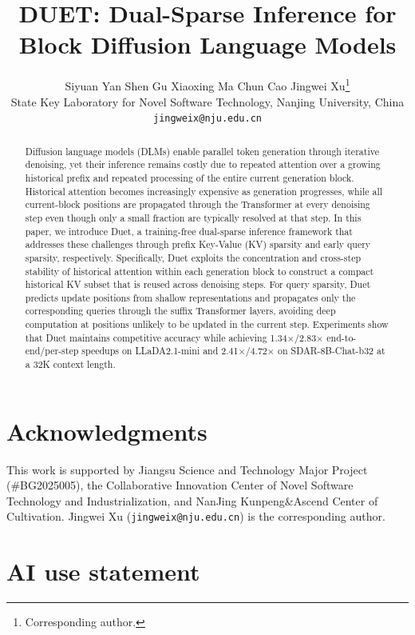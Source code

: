 \documentclass{article}
\title{DUET: Dual-Sparse Inference for \\ Block Diffusion Language Models}
\author{Siyuan Yan \quad Shen Gu \quad Xiaoxing Ma \quad Chun Cao \quad  Jingwei Xu\thanks{Corresponding author.} \\
State Key Laboratory for Novel Software Technology, Nanjing University, China \\
\texttt{jingweix@nju.edu.cn}}
\date{}
\begin{document}
\maketitle

\begin{abstract}
Diffusion language models (DLMs) enable parallel token generation through iterative denoising, yet their inference remains costly due to repeated attention over a growing historical prefix and repeated processing of the entire current generation block. Historical attention becomes increasingly expensive as generation progresses, while all current-block positions are propagated through the Transformer at every denoising step even though only a small fraction are typically resolved at that step. In this paper, we introduce Duet, a training-free dual-sparse inference framework that addresses these challenges through prefix Key-Value (KV) sparsity and early query sparsity, respectively. Specifically, Duet exploits the concentration and cross-step stability of historical attention within each generation block to construct a compact historical KV subset that is reused across denoising steps. For query sparsity, Duet predicts update positions from shallow representations and propagates only the corresponding queries through the suffix Transformer layers, avoiding deep computation at positions unlikely to be updated in the current step. Experiments show that Duet maintains competitive accuracy while achieving 1.34$\times$/2.83$\times$ end-to-end/per-step speedups on LLaDA2.1-mini and 2.41$\times$/4.72$\times$ on SDAR-8B-Chat-b32 at a 32K context length. 
\end{abstract}








\section*{Acknowledgments}
This work is supported by
Jiangsu Science and Technology Major Project (\#BG2025005), the Collaborative Innovation Center
of Novel Software Technology and Industrialization, and NanJing Kunpeng\&Ascend Center of Cultivation.
Jingwei Xu (\texttt{jingweix@nju.edu.cn}) is the corresponding author.

\section*{AI use statement}
\end{document}
